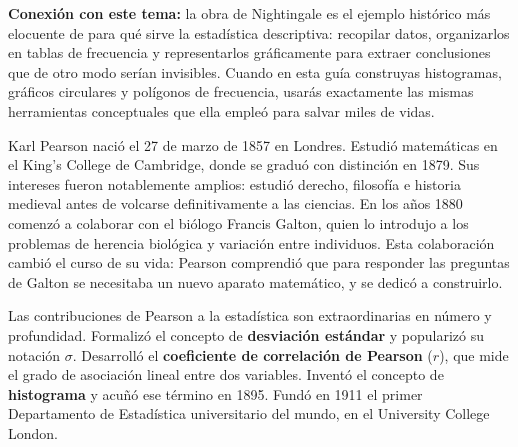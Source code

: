 \documentclass[11pt, letterpaper]{article}
\begin{document}
\begin{tcolorbox}
\begin{minipage}[t]{0.78\linewidth}
\medskip

\textbf{Conexión con este tema:} la obra de Nightingale es el ejemplo histórico más elocuente de para qué sirve la estadística descriptiva: recopilar datos, organizarlos en tablas de frecuencia y representarlos gráficamente para extraer conclusiones que de otro modo serían invisibles. Cuando en esta guía construyas histogramas, gráficos circulares y polígonos de frecuencia, usarás exactamente las mismas herramientas conceptuales que ella empleó para salvar miles de vidas.
\end{minipage}

\end{tcolorbox}

\vspace{0.65cm}

\begin{tcolorbox}[enhanced, breakable,
  colback=white, colframe=blockc, colbacktitle=blockc,
  coltitle=white, arc=4pt, leftrule=5pt,
  left=10pt, right=10pt, top=12pt, bottom=10pt,
  fonttitle=\bfseries,
  attach boxed title to top left={xshift=0.5cm, yshift*=-\tcboxedtitleheight/2},
  boxed title style={colframe=blockc, colback=blockc, arc=2pt},
  title={Karl Pearson \hfill \normalfont\itshape 1857 --- 1936}]

\begin{minipage}[t]{0.78\linewidth}
\vspace{0pt}

Karl Pearson nació el 27 de marzo de 1857 en Londres. Estudió matemáticas en el King's College de Cambridge, donde se graduó con distinción en 1879. Sus intereses fueron notablemente amplios: estudió derecho, filosofía e historia medieval antes de volcarse definitivamente a las ciencias. En los años 1880 comenzó a colaborar con el biólogo Francis Galton, quien lo introdujo a los problemas de herencia biológica y variación entre individuos. Esta colaboración cambió el curso de su vida: Pearson comprendió que para responder las preguntas de Galton se necesitaba un nuevo aparato matemático, y se dedicó a construirlo.

\medskip
Las contribuciones de Pearson a la estadística son extraordinarias en número y profundidad. Formalizó el concepto de \textbf{desviación estándar} y popularizó su notación $\sigma$. Desarrolló el \textbf{coeficiente de correlación de Pearson} ($r$), que mide el grado de asociación lineal entre dos variables. Inventó el concepto de \textbf{histograma} y acuñó ese término en 1895. Fundó en 1911 el primer Departamento de Estadística universitario del mundo, en el University College London.


\end{minipage}
\end{tcolorbox}
\end{document}
